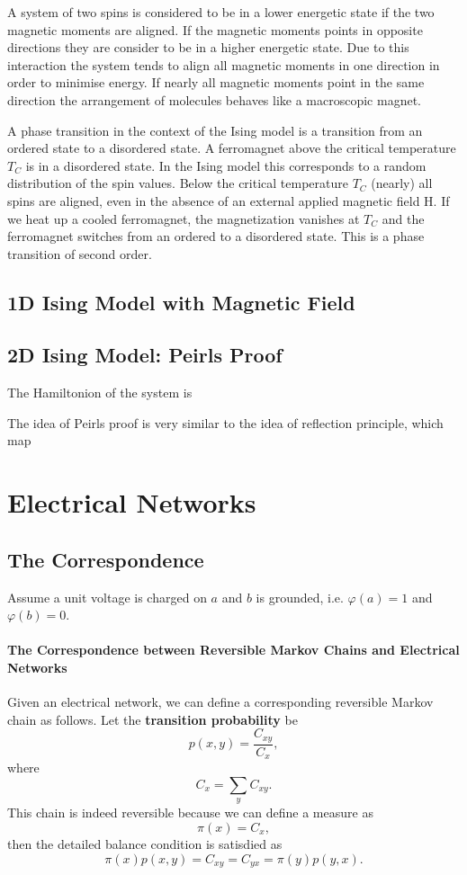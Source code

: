 \documentclass{article}
\theoremstyle{definition}
\newcommand{\<}{\left\langle}
\renewcommand{\>}{\right\rangle}
\begin{document}
A system of two spins is considered to be in a lower energetic state if the two magnetic
moments are aligned. If the magnetic moments points in opposite directions they are
consider to be in a higher energetic state. Due to this interaction the system tends to
align all magnetic moments in one direction in order to minimise energy. If nearly all
magnetic moments point in the same direction the arrangement of molecules behaves like
a macroscopic magnet.

A phase transition in the context of the Ising model is a transition from an ordered state
to a disordered state. A ferromagnet above the critical temperature $T_C$ is in a disordered
state. In the Ising model this corresponds to a random distribution of the spin values.
Below the critical temperature $T_C$ (nearly) all spins are aligned, even in the absence of an
external applied magnetic field H. If we heat up a cooled ferromagnet, the magnetization
vanishes at $T_C$ and the ferromagnet switches from an ordered to a disordered state. This
is a phase transition of second order.


\subsection{1D Ising Model with Magnetic Field}

\subsection{2D Ising Model: Peirls Proof}
The Hamiltonion of the system is 
\[ \]

The idea of Peirls proof is very similar to the idea of reflection principle,
which map 


\section{Electrical Networks}
\subsection{The Correspondence}

Assume a unit voltage is charged on $a$ and $b$ is grounded, i.e. $\varphi(a)=1$ and $\varphi(b)=0$.

\paragraph{The Correspondence between Reversible Markov Chains and Electrical Networks}
Given an electrical network, we can define a corresponding reversible Markov chain as follows.
Let the \textbf{transition probability} be \[p(x,y)=\frac{C_{xy}}{C_x},\] 
where \[C_x=\sum_{y} C_{xy} .\]
This chain is indeed reversible because we can define a measure as 
\[\pi(x)=C_x,\] 
then the detailed balance condition is satisdied as 
\[\pi(x)p(x,y)= C_{xy}= C_{yx}=\pi(y)p(y,x).\]
\end{document}
